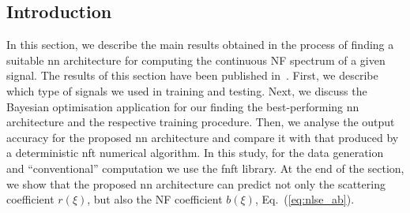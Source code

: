 \subsection{Introduction}
\label{sec:nn_nft_intro}

In this section, we describe the main results obtained in the process of finding a suitable \acrshort{nn} architecture for computing the continuous NF spectrum of a given signal. 
The results of this section have been published in~\cite{sedov2021neural}.
First, we describe which type of signals we used in training and testing. Next, we discuss the Bayesian optimisation application for our finding the best-performing \acrshort{nn} architecture and the respective training procedure. 
Then, we analyse the output accuracy for the proposed \acrshort{nn} architecture and compare it with that produced by a deterministic \acrshort{nft} numerical algorithm.
In this study, for the data generation and ``conventional'' computation we use the \acrfull{fnft} library\cite{FNFT2018}.
At the end of the section, we show that the proposed \acrshort{nn} architecture can predict not only the scattering coefficient $r(\xi)$, but also the NF coefficient $b(\xi)$, Eq.~(\ref{eq:nlse_ab}).
